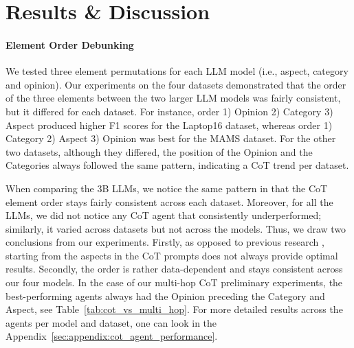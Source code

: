 \documentclass[11pt]{article}
\begin{document}


\section{Results \& Discussion}

\paragraph{Element Order Debunking}
We tested three element permutations for each LLM model (i.e., aspect, category and opinion). Our experiments on the four datasets demonstrated that the order of the three elements between the two larger LLM models was fairly consistent, but it differed for each dataset. For instance, order 1) Opinion 2) Category 3) Aspect produced higher F1 scores for the Laptop16 dataset, whereas order 1) Category 2) Aspect 3) Opinion was best for the MAMS dataset. For the other two datasets, although they differed, the position of the Opinion and the Categories always followed the same pattern, indicating a CoT trend per dataset.

When comparing the 3B LLMs, we notice the same pattern in that the CoT element order stays fairly consistent across each dataset. Moreover, for all the LLMs, we did not notice any CoT agent that consistently underperformed; similarly, it varied across datasets but not across the models. Thus, we draw two conclusions from our experiments. Firstly, as opposed to previous research \citep{fei-etal-2023-reasoning,10499502}, starting from the aspects in the CoT prompts does not always provide optimal results. Secondly, the order is rather data-dependent and stays consistent across our four models. In the case of our multi-hop CoT preliminary experiments, the best-performing agents always had the Opinion preceding the Category and Aspect, see Table~\ref{tab:cot_vs_multi_hop}. For more detailed results across the agents per model and dataset, one can look in the Appendix~\ref{sec:appendix:cot_agent_performance}.


\end{document}
